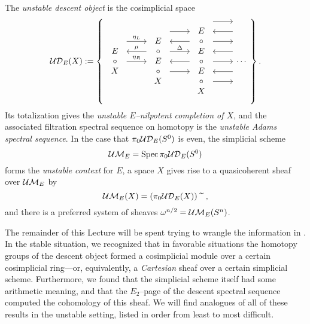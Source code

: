 \begin{definition}\label{UASSDefinition}
The \textit{unstable descent object} is the cosimplicial space
\[\sheaf{UD}_E(X) := \left\{
\begin{tikzcd}
\begin{array}{c} E \\ \circ \\ X \end{array} \arrow[leftarrow, shift left=\baselineskip]{r}{\mu} \arrow[shift left=(2*\baselineskip)]{r}{\eta_L} \arrow{r}{\eta_R} &
\begin{array}{c} E \\ \circ \\ E \\ \circ \\ X \end{array} \arrow[shift left=(3*\baselineskip)]{r} \arrow[leftarrow, shift left=(2*\baselineskip)]{r} \arrow[shift left=\baselineskip]{r}{\Delta} \arrow[leftarrow]{r} \arrow[shift right=\baselineskip]{r} &
\begin{array}{c} E \\ \circ \\ E \\ \circ \\ E \\ \circ \\ X \end{array} \arrow[shift left=(4*\baselineskip)]{r} \arrow[leftarrow, shift left=(3*\baselineskip)]{r} \arrow[shift left=(2*\baselineskip)]{r} \arrow[leftarrow, shift left=\baselineskip]{r} \arrow{r} \arrow[leftarrow, shift right=\baselineskip]{r} \arrow[shift right=(2*\baselineskip)]{r} &
\cdots
\end{tikzcd}
\right\}.\]
Its totalization gives the \textit{unstable \(E\)--nilpotent completion of \(X\)}, and the associated filtration spectral sequence on homotopy is the \textit{unstable Adams spectral sequence}.  In the case that \(\pi_0 \mathcal{UD}_E(S^0)\) is even, the simplicial scheme \[\mathcal{UM}_{E} = \operatorname{Spec} \pi_0 \mathcal{UD}_E(S^0)\] forms the \textit{unstable context} for \(E\), a space \(X\) gives rise to a quasicoherent sheaf over \(\mathcal{UM}_{E}\) by \[\mathcal{UM}_{E}(X) = (\pi_0 \mathcal{UD}_E(X))\widetilde{\quad},\] and there is a preferred system of sheaves \(\omega^{n/2} = \mathcal{UM}_{E}(S^n)\).
\end{definition}

The remainder of this Lecture will be spent trying to wrangle the information in .  In the stable situation, we recognized that in favorable situations the homotopy groups of the descent object formed a cosimplicial module over a certain cosimplicial ring---or, equivalently, a \emph{Cartesian} sheaf over a certain simplicial scheme.  Furthermore, we found that the simplicial scheme itself had some arithmetic meaning, and that the \(E_2\)--page of the descent spectral sequence computed the cohomology of this sheaf.  We will find analogues of all of these results in the unstable setting, listed in order from least to most difficult.

